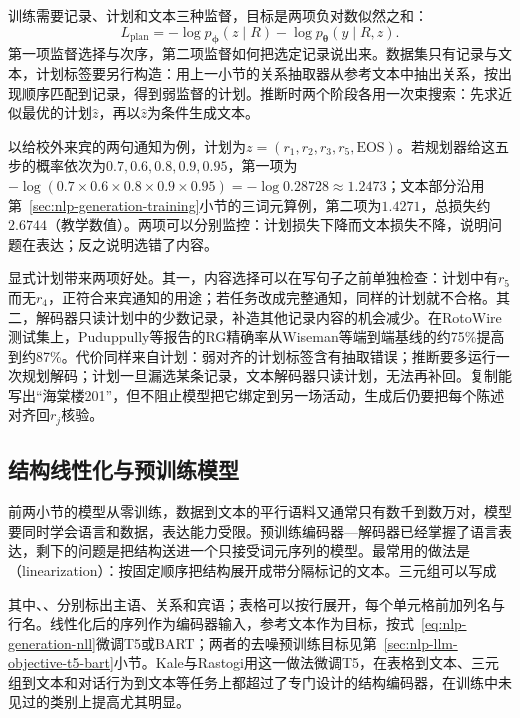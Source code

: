 训练需要记录、计划和文本三种监督，目标是两项负对数似然之和：
\begin{equation}
  L_{\mathrm{plan}}
  =-\log p_{\bm{\phi}}(z\mid R)
   -\log p_{\bm{\theta}}(y\mid R,z).
  \label{eq:nlp-generation-plan-loss}
\end{equation}
第一项监督选择与次序，第二项监督如何把选定记录说出来。数据集只有记录与文本，计划标签要另行构造：用上一小节的关系抽取器从参考文本中抽出关系，按出现顺序匹配到记录，得到弱监督的计划。推断时两个阶段各用一次束搜索：先求近似最优的计划$\hat z$，再以$\hat z$为条件生成文本。

以给校外来宾的两句通知为例，计划为$z=(r_1,r_2,r_3,r_5,\mathrm{EOS})$。若规划器给这五步的概率依次为$0.7,0.6,0.8,0.9,0.95$，第一项为$-\log(0.7\times0.6\times0.8\times0.9\times0.95)=-\log0.28728\approx1.2473$；文本部分沿用第~\ref{sec:nlp-generation-training}小节的三词元算例，第二项为$1.4271$，总损失约$2.6744$（教学数值）。两项可以分别监控：计划损失下降而文本损失不降，说明问题在表达；反之说明选错了内容。

显式计划带来两项好处。其一，内容选择可以在写句子之前单独检查：计划中有$r_5$而无$r_4$，正符合来宾通知的用途；若任务改成完整通知，同样的计划就不合格。其二，解码器只读计划中的少数记录，补造其他记录内容的机会减少。在RotoWire测试集上，Puduppully等报告的RG精确率从Wiseman等端到端基线的约75\%提高到约87\%。代价同样来自计划：弱对齐的计划标签含有抽取错误；推断要多运行一次规划解码；计划一旦漏选某条记录，文本解码器只读计划，无法再补回。复制能写出“海棠楼201”，但不阻止模型把它绑定到另一场活动，生成后仍要把每个陈述对齐回$r_j$核验。

\subsection{结构线性化与预训练模型}
\label{sec:nlp-generation-linearization}

前两小节的模型从零训练，数据到文本的平行语料又通常只有数千到数万对，模型要同时学会语言和数据，表达能力受限。预训练编码器—解码器已经掌握了语言表达，剩下的问题是把结构送进一个只接受词元序列的模型。最常用的做法是（linearization）：按固定顺序把结构展开成带分隔标记的文本。三元组可以写成
\begin{center}
\end{center}
其中、、分别标出主语、关系和宾语；表格可以按行展开，每个单元格前加列名与行名。线性化后的序列作为编码器输入，参考文本作为目标，按式~\eqref{eq:nlp-generation-nll}微调T5或BART；两者的去噪预训练目标见第~\ref{sec:nlp-llm-objective-t5-bart}小节。Kale与Rastogi用这一做法微调T5，在表格到文本、三元组到文本和对话行为到文本等任务上都超过了专门设计的结构编码器，在训练中未见过的类别上提高尤其明显。

